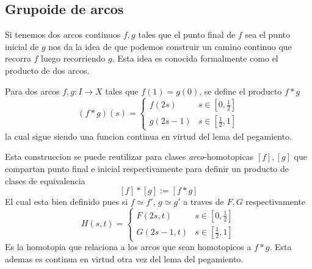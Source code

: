 \subsection{Grupoide de arcos}
Si tenemos dos arcos continuos \(f,g\) tales que el punto final de \(f\)
sea el punto inicial de \(g\) nos da la idea de que podemos construir un
camino continuo que recorra \(f\) luego recorriendo \(g\). Esta idea es
conocida formalmente como el producto de dos arcos.

\begin{definicion}
Para dos arcos \(f,g : I \to X\) tales que
\(f(1) = g(0)\), se define el producto \(f * g \)
\[ (f*g) (s) = \begin{cases}
    f(2s) & s \in [0,\frac{1}{2}] \\
    g(2s - 1) & s \in [\frac{1}{2} , 1]
  \end{cases}
\]
la cual sigue siendo una funcion continua en virtud del lema del
pegamiento.
\end{definicion}

Esta construccion se puede reutilizar para clases
\emph{arco}-homotopicas \([f],[g]\) que compartan punto final e inicial
respectivamente para definir un producto de clases de equivalencia
\[ [f] * [g] := [f * g]\]
El cual esta bien definido pues si \(f \simeq f'\), \(g \simeq
g'\) a traves de \(F, G\) respectivamente
\[H(s,t) = \begin{cases}
    F(2s,t) & s \in [0, \frac{1}{2}] \\
    G(2s - 1, t) & s \in [\frac{1}{2} , 1]
  \end{cases}
\]
Es la homotopia que relaciona a los arcos que sean homotopicos a
\(f*g\). Esta ademas es continua en virtud otra vez del lema del pegamiento.

